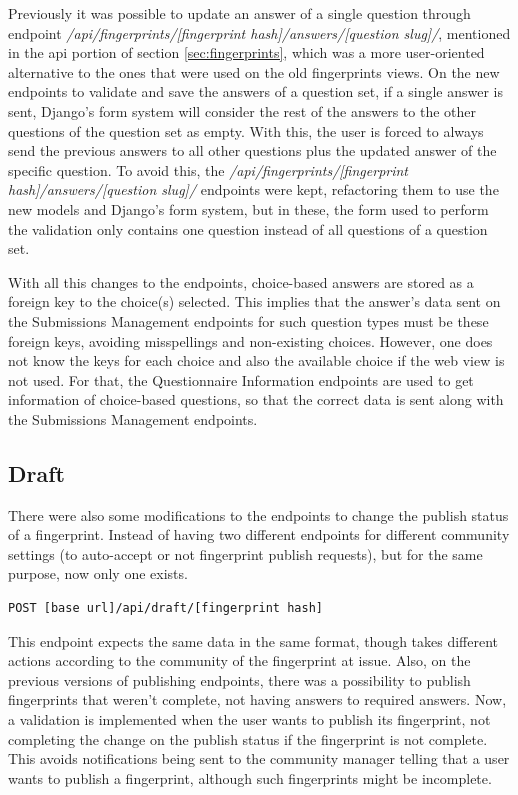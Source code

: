 Previously it was possible to update an answer of a single question through endpoint \textit{/api/fingerprints/[fingerprint hash]/answers/[question slug]/}, mentioned in the \gls{api} portion of section \ref{sec:fingerprints}, which was a more user-oriented alternative to the ones that were used on the old fingerprints views.
On the new endpoints to validate and save the answers of a question set, if a single answer is sent, Django's form system will consider the rest of the answers to the other questions of the question set as empty.
With this, the user is forced to always send the previous answers to all other questions plus the updated answer of the specific question.
To avoid this, the \textit{/api/fingerprints/[fingerprint hash]/answers/[question slug]/} endpoints were kept, refactoring them to use the new models and Django's form system, but in these, the form used to perform the validation only contains one question instead of all questions of a question set.

With all this changes to the endpoints, choice-based answers are stored as a foreign key to the choice(s) selected.
This implies that the answer's data sent on the Submissions Management endpoints for such question types must be these foreign keys, avoiding misspellings and non-existing choices.
However, one does not know the keys for each choice and also the available choice if the web view is not used.
For that, the Questionnaire Information endpoints are used to get information of choice-based questions, so that the correct data is sent along with the Submissions Management endpoints.

\subsection*{Draft}

There were also some modifications to the endpoints to change the publish status of a fingerprint.
Instead of having two different endpoints for different community settings (to auto-accept or not fingerprint publish requests), but for the same purpose, now only one exists.

\begin{verbatim}
POST [base url]/api/draft/[fingerprint hash]
\end{verbatim}

This endpoint expects the same data in the same format, though takes different actions according to the community of the fingerprint at issue.
Also, on the previous versions of publishing endpoints, there was a possibility to publish fingerprints that weren't complete, not having answers to required answers.
Now, a validation is implemented when the user wants to publish its fingerprint, not completing the change on the publish status if the fingerprint is not complete.
This avoids notifications being sent to the community manager telling that a user wants to publish a fingerprint, although such fingerprints might be incomplete.

